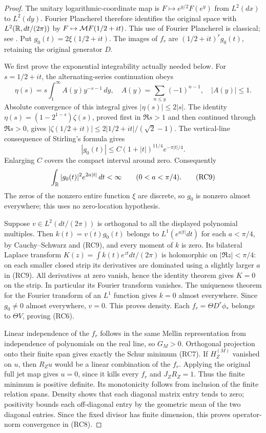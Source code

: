 \documentclass[11pt]{article}
\begin{document}
\begin{proof}
The unitary logarithmic-coordinate map is
$F\mapsto e^{y/2}F(e^y)$ from $L^2(dx)$ to $L^2(dy)$.
Fourier Plancherel therefore identifies the original space with
$L^2(\mathbb R,dt/(2\pi))$ by $F\mapsto\mathcal M F(1/2+it)$.
This use of Fourier Plancherel is classical; see \cite{cr:SteinFourier}.
Put $g_0(t)=2\xi(1/2+it)$. The images of $f_r$ are
$(1/2+it)^rg_0(t)$, retaining the original generator $D$.

We first prove the exponential integrability actually needed below.
For $s=1/2+it$, the alternating-series continuation obeys
\[
 \eta(s)=s\int_1^\infty A(y)y^{-s-1}\,dy,
 \quad A(y)=\sum_{n\le y}(-1)^{n-1},\quad |A(y)|\le1.
\]
Absolute convergence of this integral gives $|\eta(s)|\le2|s|$.
The identity $\eta(s)=(1-2^{1-s})\zeta(s)$, proved first in
$\Re s>1$ and then continued through $\Re s>0$, gives
$|\zeta(1/2+it)|\le2|1/2+it|/(\sqrt2-1)$.
The vertical-line consequence of Stirling's formula
\cite[5.11.3]{cr:DLMFStirling} gives
\[
 |g_0(t)|\le C(1+|t|)^{11/4}e^{-\pi|t|/4}.
\]
Enlarging $C$ covers the compact interval around zero. Consequently
\[
 \int_\mathbb R |g_0(t)|^2e^{2a|t|}\,dt<\infty
 \qquad(0<a<\pi/4).
 \tag{RC9}
\]
The zeros of the nonzero entire function $\xi$ are discrete, so
$g_0$ is nonzero almost everywhere; this uses no zero-location
hypothesis.

Suppose $v\in L^2(dt/(2\pi))$ is orthogonal to all the displayed
polynomial multiples. Then $k(t)=\overline{v(t)}g_0(t)$ belongs
to $L^1(e^{a|t|}dt)$ for each $a<\pi/4$, by Cauchy--Schwarz
and (RC9), and every moment of $k$ is zero. Its bilateral Laplace
transform $K(z)=\int k(t)e^{zt}dt/(2\pi)$ is holomorphic on
$|\Re z|<\pi/4$: on each smaller closed strip its derivatives
are dominated using a slightly larger $a$ in (RC9).
All derivatives at zero vanish, hence the identity theorem gives
$K=0$ on the strip. In particular its Fourier transform vanishes.
The uniqueness theorem for the Fourier transform of an $L^1$
function \cite{cr:SteinFourier} gives $k=0$ almost everywhere.
Since $g_0\ne0$ almost everywhere, $v=0$. This proves density.
Each $f_r=\Theta D^r\phi_*$ belongs to $\Theta V$, proving (RC6).

Linear independence of the $f_r$ follows in the same Mellin
representation from independence of polynomials on the real line,
so $G_M>0$. Orthogonal projection onto their finite span gives
exactly the Schur minimum (RC7). If $H_Z^{(M)}$ vanished on
$u$, then $R_Zu$ would be a linear combination of the $f_r$.
Applying the original full jet map gives $u=0$, since it kills
every $f_r$ and $J_ZR_Z=1$. Thus the finite minimum is positive
definite. Its monotonicity follows from inclusion of the finite
relation spans. Density shows that each diagonal matrix entry
tends to zero; positivity bounds each off-diagonal entry by the
geometric mean of the two diagonal entries. Since the fixed
divisor has finite dimension, this proves operator-norm convergence
in (RC8).
\end{proof}
\end{document}
